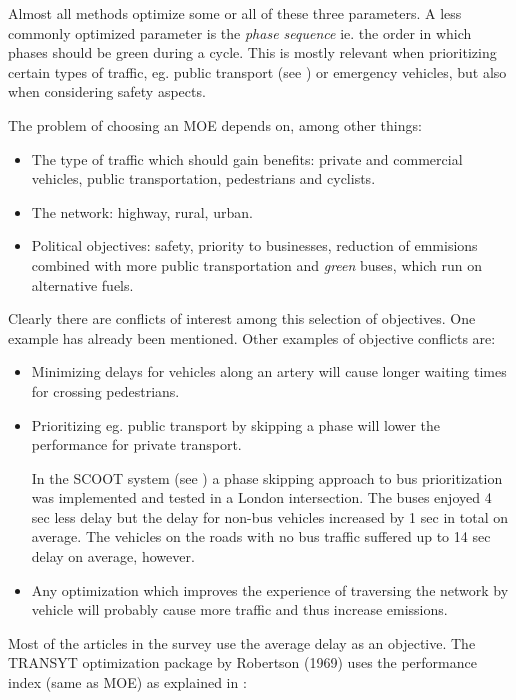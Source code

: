Almost all methods optimize some or all of these three parameters. A
less commonly optimized parameter is the \textit{phase sequence}
ie. the order in which phases should be green during a cycle. This is
mostly relevant when prioritizing certain types of traffic, eg. public
transport (see \cite{scoot2004}) or emergency vehicles, but also when
considering safety aspects.

The problem of choosing an MOE depends on, among other things:

\begin{itemize}
\item The type of traffic which should gain benefits: private and commercial vehicles, public transportation, pedestrians and cyclists.
\item The network: highway, rural, urban.
\item Political objectives: safety, priority to businesses, reduction of emmisions combined with more public transportation and \textit{green} buses, which run on alternative fuels.
\end{itemize}

Clearly there are conflicts of interest among this selection of
objectives. One example has already been mentioned. Other examples of
objective conflicts are:

\begin{itemize}
\item Minimizing delays for vehicles along an artery will cause longer waiting times for crossing pedestrians.
\item Prioritizing eg. public transport by skipping a phase will lower the performance for private transport. 

In the SCOOT system (see \cite{scoot2004}) a phase skipping approach
to bus prioritization was implemented and tested in a London
intersection. The buses enjoyed 4 sec less delay but the delay for
non-bus vehicles increased by 1 sec in total on average. The vehicles
on the roads with no bus traffic suffered up to 14 sec delay on
average, however.

\item Any optimization which improves the experience of traversing the network by vehicle will probably cause more traffic and thus increase emissions.

\end{itemize}

Most of the articles in the survey use the average delay as an
objective. The TRANSYT optimization package by Robertson (1969) uses
the performance index (same as MOE) as explained in \cite{26}:

